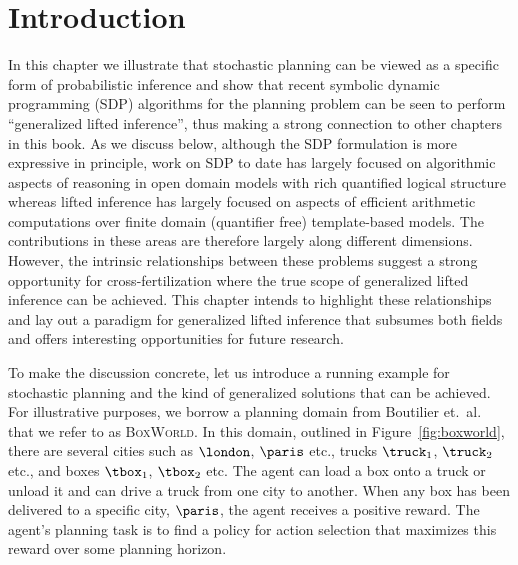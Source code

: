 %

\section{Introduction}

In this chapter we illustrate that stochastic planning can be viewed
as a specific form of probabilistic inference and show that recent symbolic
dynamic programming (SDP) algorithms for the planning problem can be
seen to perform  ``generalized lifted
inference'', thus making a strong connection to other chapters in this
book.  As we discuss below, although the SDP formulation is more
expressive in principle, work on SDP to date has largely focused on
algorithmic aspects of reasoning in open domain models with rich
quantified logical structure whereas lifted inference has largely
focused on aspects of efficient arithmetic computations
over finite domain (quantifier free) template-based models.
The contributions in these areas are therefore largely along different dimensions.
%
%
%
%
%
%
%
%
%
%
%
%
%
%
%
%
%
%
%
%
%
However, the intrinsic relationships between these problems
suggest a strong opportunity for cross-fertilization where the
true scope of generalized lifted inference can be achieved.  This
chapter intends to highlight these relationships and 
lay out a paradigm for generalized lifted inference that subsumes both
fields and offers interesting opportunities for future research.

%
%

To make the discussion concrete, let us introduce a running example for stochastic
planning and the kind of generalized solutions that can be achieved.
For illustrative purposes, we borrow a planning domain from Boutilier
et.\ al.~\cite{BoutilierRePr01} that we refer to as \textsc{BoxWorld}.
In this domain, outlined in Figure~\ref{fig:boxworld}, there are
several cities such as $\london$, $\paris$ etc., trucks $\truck_1$,
$\truck_2$ etc., and boxes $\tbox_1$, $\tbox_2$ etc. The agent can load
a box onto a truck or unload it and can drive a truck from one city to
another.  When any box 
%
has been delivered to a
specific city, $\paris$, the agent receives a positive
reward.  The agent's planning task is to find a policy for action
selection that maximizes this reward over some planning horizon.

%
%
%
%
%
%


